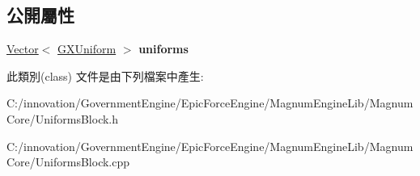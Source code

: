 \subsection*{公開屬性}
\begin{DoxyCompactItemize}
\item 
\hyperlink{class_i_dream_sky_1_1_vector}{Vector}$<$ \hyperlink{class_i_dream_sky_1_1_g_x_uniform}{G\+X\+Uniform} $>$ {\bfseries uniforms}\hypertarget{class_i_dream_sky_1_1_uniforms_block_a4562a5440c72b9f735623b09c666309f}{}\label{class_i_dream_sky_1_1_uniforms_block_a4562a5440c72b9f735623b09c666309f}

\end{DoxyCompactItemize}


此類別(class) 文件是由下列檔案中產生\+:\begin{DoxyCompactItemize}
\item 
C\+:/innovation/\+Government\+Engine/\+Epic\+Force\+Engine/\+Magnum\+Engine\+Lib/\+Magnum\+Core/Uniforms\+Block.\+h\item 
C\+:/innovation/\+Government\+Engine/\+Epic\+Force\+Engine/\+Magnum\+Engine\+Lib/\+Magnum\+Core/Uniforms\+Block.\+cpp\end{DoxyCompactItemize}

